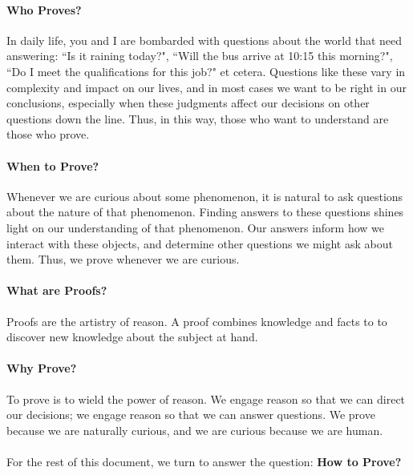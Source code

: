 \documentclass[../proofs.tex]{subfiles}
\begin{document}
\paragraph{Who Proves?} In daily life, you and I are bombarded with questions
about the world that need answering: ``Is it raining today?", ``Will the bus
arrive at 10:15 this morning?", ``Do I meet the qualifications for this job?"
et cetera. Questions like these vary in complexity and impact on our lives,
and in most cases we want to be right in our conclusions, especially when these
judgments affect our decisions on other questions down the line. Thus, in this
way, those who want to understand are those who prove.

\paragraph{When to Prove?} Whenever we are curious about some phenomenon,
it is natural to ask questions about the nature of that phenomenon. Finding
answers to these questions shines light on our understanding of that phenomenon.
Our answers inform how we interact with these objects, and determine other
questions we might ask about them. Thus, we prove whenever we are curious.

\paragraph{What are Proofs?} Proofs are the artistry of reason. A proof combines
knowledge and facts to to discover new knowledge about the subject at hand.

\paragraph{Why Prove?} To prove is to wield the power of reason. We engage
reason so that we can direct our decisions; we engage reason so that we can
answer questions. We prove because we are naturally curious, and we are curious
because we are human.


\paragraph{} For the rest of this document, we turn to answer the question:
\textbf{How to Prove?}
\end{document}
